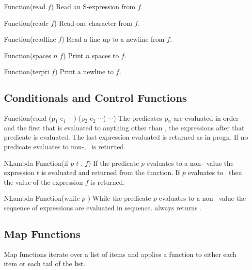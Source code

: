 \begin{defun}{Function}{(read $f$)}
  Read an S-expression from $f$.
\end{defun}

\begin{defun}{Function}{(readc $f$)}
  Read one character from $f$.
\end{defun}

\begin{defun}{Function}{(readline $f$)}
  Read a line up to a newline from $f$.
\end{defun}

\begin{defun}{Function}{(spaces $n$ $f$)}
  Print $n$ spaces to $f$.
\end{defun}

\begin{defun}{Function}{(terpri $f$)}
  Print a newline to $f$.
\end{defun}

\subsection{Conditionals and Control Functions}

\begin{defun}{Function}{(cond (p$_{1}$ e$_{1}$ $\cdots$) (p$_{2}$ e$_{2}$ $\cdots$)
    $\cdots$)} The predicates p$_{n}$ are evaluated in order
  and the first that is evaluated to anything other than \NIL, the
  expressions after that predicate is evaluated.  The last expression
  evaluated is returned as in progn.  If no predicate evaluates to
  non-\NIL, \NIL\ is returned.
\end{defun}


\begin{defun}{NLambda Function}{(if $p$ $t$ . $f$)}
  If the predicate $p$ evaluates to a non-\NIL\ value the expression
  $t$ is evaluated and returned from the function. If $p$ evaluates to
  \NIL\ then the value of the expression $f$ is returned.
\end{defun}

\begin{defun}{NLambda Function}{(while $p$ \xargs)}
  While the predicate $p$ evaluates to a non-\NIL\ value the sequence
  of expressions \largs are evaluated in sequence.  always
  returns \NIL.
\end{defun}

\subsection{Map Functions}
Map functions iterate over a list of items and applies a function to
either each item or each tail of the list.

